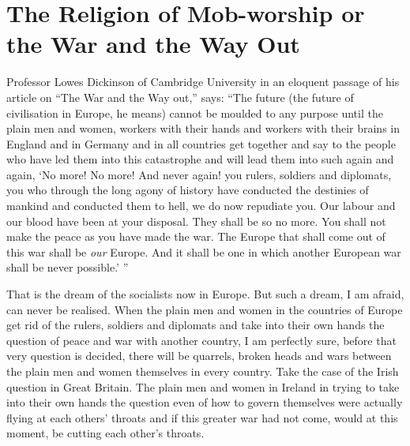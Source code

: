 
\chapter[The Religion of Mob-worship or the War and the Way Out]{The Religion of Mob-worship or \\the War and the Way Out}



Professor Lowes Dickinson of Cambridge University in an eloquent passage of his article on
``The War and the Way out,'' says:
``The future (the future of civilisation in Europe, he means) cannot be moulded to any purpose until the plain men and women,
workers with their hands and workers with their brains in England and in Germany and in all countries get together and say to the people
who have led them into this catastrophe and will lead them into such again and again,
`No more! No more! And never again! you rulers, soldiers and diplomats,
you who through the long agony of history have conducted the destinies of mankind and conducted them to hell,
we do now repudiate you.
Our labour and our blood have been at your disposal.
They shall be so no more.
You shall not make the peace as you have made the war.
The Europe that shall come out of this war shall be \emph{our} Europe.
And it shall be one in which another European war shall be never possible.' ''

That is the dream of the socialists now in Europe.
But such a dream, I am afraid, can never be realised.
When the plain men and women in the countries of Europe get rid of the rulers,
soldiers and diplomats and take into their own hands the question of peace and war with another country,
I am perfectly sure, before that very question is decided,
there will be quarrels, broken heads and wars between the plain men and women themselves
in every country.
Take the case of the Irish question in Great Britain.
The plain men and women in Ireland in trying to take into their own hands the question even of
how to govern themselves were actually flying at each others' throats
and if this greater war had not come, would at this moment,
be cutting each other's throats.

